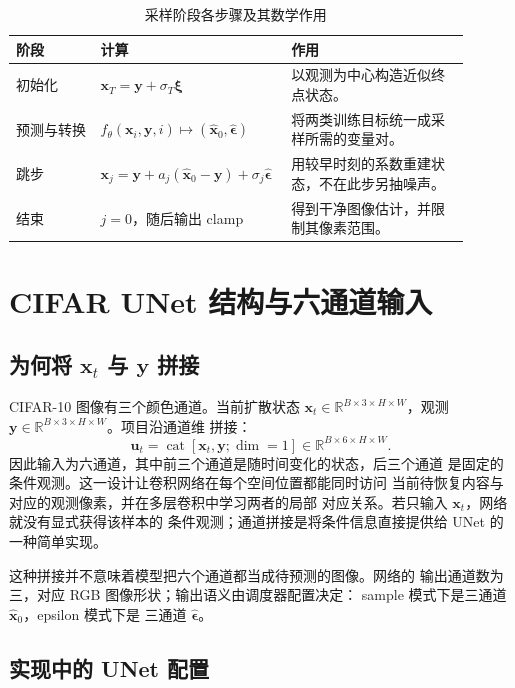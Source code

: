 \documentclass[UTF8,a4paper,12pt]{ctexart}
\begin{document}
\begin{table}[htbp]
\centering
\caption{采样阶段各步骤及其数学作用}
\label{tab:sampling}
\begin{tabular}{p{0.18\linewidth}p{0.34\linewidth}p{0.38\linewidth}}
\toprule
阶段 & 计算 & 作用 \\
\midrule
初始化
& \(\bm{x}_T=\bm{y}+\sigma_T\bm{\xi}\)
& 以观测为中心构造近似终点状态。 \\
预测与转换
& \(f_\theta(\bm{x}_i,\bm{y},i)
  \mapsto(\widehat{\bm{x}}_0,\widehat{\bm{\epsilon}})\)
& 将两类训练目标统一成采样所需的变量对。 \\
跳步
& \(\bm{x}_j=\bm{y}+a_j(\widehat{\bm{x}}_0-\bm{y})
+\sigma_j\widehat{\bm{\epsilon}}\)
& 用较早时刻的系数重建状态，不在此步另抽噪声。 \\
结束
& \(j=0\)，随后输出 clamp
& 得到干净图像估计，并限制其像素范围。 \\
\bottomrule
\end{tabular}
\end{table}

\section{CIFAR UNet 结构与六通道输入}

\subsection{为何将 \(\bm{x}_t\) 与 \(\bm{y}\) 拼接}

CIFAR-10 图像有三个颜色通道。当前扩散状态
\(\bm{x}_t\in\mathbb{R}^{B\times3\times H\times W}\)，观测
\(\bm{y}\in\mathbb{R}^{B\times3\times H\times W}\)。项目沿通道维
拼接：
\begin{equation}
  \bm{u}_t
  =
  \operatorname{cat}[\bm{x}_t,\bm{y};\operatorname{dim}=1]
  \in\mathbb{R}^{B\times6\times H\times W}.
\end{equation}
因此输入为六通道，其中前三个通道是随时间变化的状态，后三个通道
是固定的条件观测。这一设计让卷积网络在每个空间位置都能同时访问
当前待恢复内容与对应的观测像素，并在多层卷积中学习两者的局部
对应关系。若只输入 \(\bm{x}_t\)，网络就没有显式获得该样本的
条件观测；通道拼接是将条件信息直接提供给 UNet 的一种简单实现。

这种拼接并不意味着模型把六个通道都当成待预测的图像。网络的
输出通道数为三，对应 RGB 图像形状；输出语义由调度器配置决定：
sample 模式下是三通道 \(\widehat{\bm{x}}_0\)，epsilon 模式下是
三通道 \(\widehat{\bm{\epsilon}}\)。

\subsection{实现中的 UNet 配置}
\end{document}
